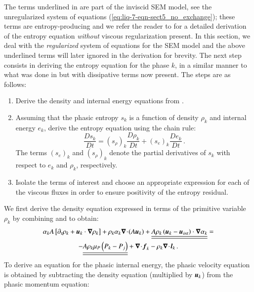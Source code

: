 %
The terms underlined in  are part of the inviscid SEM model, see the unregularized system of equations (\eqref{eq:liq-7-eqn-sect5_no_exchange}); these terms are entropy-producing and we refer the reader to  for a detailed derivation of the 
entropy equation \emph{without} viscous regularization present. 
In this section, we deal with the \emph{regularized} system of equations for the SEM model and 
the above underlined terms will later ignored in the derivation for brevity. 
%
The next step consists in deriving the entropy equation for the phase $k$, in a similar manner to what was done in  but 
with dissipative terms now present. The steps are as follows:
%
\begin{enumerate}
\item Derive the density and internal energy equations from .
\item Assuming that the phasic entropy $s_k$ is a function of density $\rho_k$ and internal energy $e_k$, derive the entropy equation using the chain rule:
\begin{equation}
\label{eq:chain_rule-sct4}
\frac{Ds_k}{Dt} = \left( s_{\rho} \right)_k \frac{D \rho_k}{Dt} + \left( s_{e} \right)_k \frac{D e_k}{Dt} \,.
\end{equation}
The terms $(s_e)_k$ and $(s_{\rho})_k$ denote the partial derivatives of $s_k$ with respect to $e_k$ and $\rho_k$, respectively.
\item Isolate the terms of interest and choose an appropriate expression for each of the viscous fluxes in order to ensure positivity of the entropy residual.
\end{enumerate}
%
We first derive the density equation expressed in terms of the primitive variable $\rho_k$ by combining  and  to obtain:
%
\begin{multline}\label{eq:rho-7-eqn-model-sect4}
\alpha_k A \left[ \partial_t \rho_k + \boldsymbol u_k  \cdot \boldsymbol\nabla \rho_k \right] 
+ \rho_k \alpha_k \boldsymbol\nabla\! \cdot \! (A \boldsymbol u_k ) 
+  \underline{\underline{ A \rho_k \left( \boldsymbol u_k - \boldsymbol u_{int} \right) \cdot \boldsymbol\nabla \alpha_k}} = \\-\underline{\underline{A \rho_k \mu_P \left( P_k - P_j \right)}} + \boldsymbol\nabla\! \cdot \! \boldsymbol f_k - \rho_k \boldsymbol\nabla\! \cdot \! \boldsymbol l_k \,.
\end{multline}
%
To derive an equation for the phasic internal energy, the phasic velocity equation is obtained by subtracting the density equation (multiplied by $\boldsymbol u_k$) from the phasic momentum equation:
